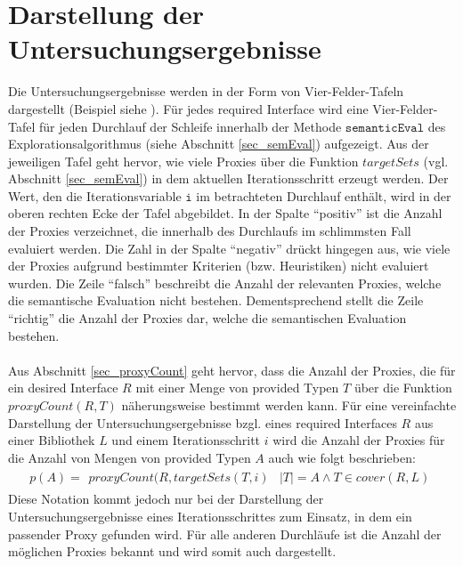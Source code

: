 \section{Darstellung der Untersuchungsergebnisse}
Die Untersuchungsergebnisse werden in der Form von Vier-Felder-Tafeln dargestellt (Beispiel siehe ). Für jedes required Interface wird eine Vier-Felder-Tafel für jeden Durchlauf der Schleife innerhalb der Methode $\texttt{semanticEval}$ des Explorationsalgorithmus (siehe Abschnitt \ref{sec_semEval}) aufgezeigt. Aus der jeweiligen Tafel geht hervor, wie viele Proxies über die Funktion $\mathit{targetSets}$ (vgl. Abschnitt \ref{sec_semEval}) in dem aktuellen Iterationsschritt erzeugt werden. Der Wert, den die Iterationsvariable $\texttt{i}$ im betrachteten Durchlauf enthält, wird in der oberen rechten Ecke der Tafel abgebildet.
In der Spalte ``positiv'' ist die Anzahl der Proxies verzeichnet, die innerhalb des Durchlaufs im schlimmsten Fall evaluiert werden. Die Zahl in der Spalte ``negativ'' drückt hingegen aus, wie viele der Proxies aufgrund bestimmter Kriterien (bzw. Heuristiken) nicht evaluiert wurden.  Die Zeile ``falsch'' beschreibt die Anzahl der relevanten Proxies, welche die semantische Evaluation nicht bestehen. Dementsprechend stellt die Zeile ``richtig'' die Anzahl der Proxies dar, welche die semantischen Evaluation bestehen.
\\\\
Aus Abschnitt \ref{sec_proxyCount} geht hervor, dass die Anzahl der Proxies, die für ein desired Interface $R$ mit einer Menge von provided Typen $T$ über die Funktion $\mathit{proxyCount(R,T)}$ näherungsweise bestimmt werden kann. Für eine vereinfachte Darstellung der Untersuchungsergebnisse bzgl. eines required Interfaces $R$ aus einer Bibliothek $L$ und einem Iterationsschritt $i$ wird die Anzahl der Proxies für die Anzahl von Mengen von provided Typen $A$ auch wie folgt beschrieben:
\begin{gather*}
p(A) = \begin{array}{l|l}
\mathit{proxyCount(R,targetSets(T,i)} & |T| = A \wedge T \in \mathit{cover(R,L)}
\end{array}
\end{gather*}
\noindent
Diese Notation kommt jedoch nur bei der Darstellung der Untersuchungsergebnisse eines Iterationsschrittes zum Einsatz, in dem ein passender Proxy gefunden wird. Für alle anderen Durchläufe ist die Anzahl der möglichen Proxies bekannt und wird somit auch dargestellt. 
